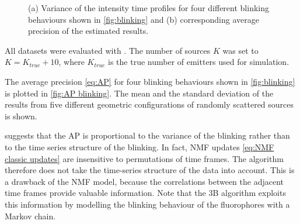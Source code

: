 \begin{figure}[!h]
	\centering
	\newcommand{\sizefig}{.40}
	\caption{(a) Variance of the intensity time profiles for four different blinking behaviours shown in \autoref{fig:blinking} and (b) corresponding average precision of the estimated results.}		
	\label{fig:variance and AP}
\end{figure}

All datasets were evaluated with \inmf{}. The number of sources $K$ was set to $K=K_{true}+10$, where $K_{true}$ is the true number of emitters used for simulation. 

The average precision \autoref{eq:AP} for four blinking behaviours shown in \autoref{fig:blinking} is plotted in \autoref{fig:AP blinking}. The mean and the standard deviation of the results from five different geometric configurations of randomly scattered sources is shown. 

 suggests that the AP is proportional to the variance of the blinking rather than to the time series structure of the blinking. In fact, NMF updates \autoref{eq:NMF classic updates} are insensitive to permutations of time frames. The \inmf{} algorithm therefore does not take the time-series structure of the data into account. This is a drawback of the NMF model, because the correlations between the adjacent time frames provide valuable information. Note that the 3B algorithm  \cite{Cox2011} exploits this information by modelling the blinking behaviour of the fluorophores with a Markov chain.


